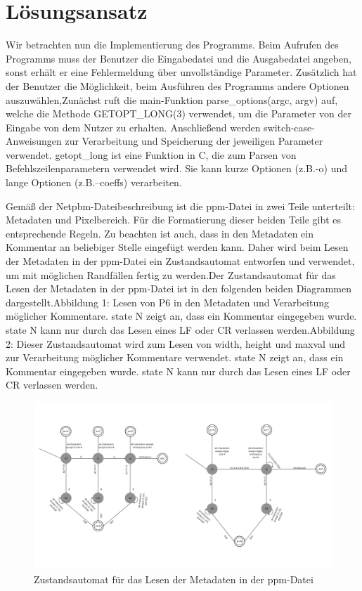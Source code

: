 \documentclass[course=erap]{aspdoc}
\begin{document}
\section{Lösungsansatz}

\par
Wir betrachten nun die Implementierung des Programms. Beim Aufrufen des Programms muss der Benutzer die Eingabedatei und die Ausgabedatei angeben, sonst erhält er eine Fehlermeldung über unvollständige Parameter. Zusätzlich hat der Benutzer die Möglichkeit, beim Ausführen des Programms andere Optionen auszuwählen,Zunächst ruft die main-Funktion parse\_options(argc, argv) auf, welche die Methode GETOPT\_LONG(3) verwendet, um die Parameter von der Eingabe von dem Nutzer zu erhalten. Anschließend werden switch-case-Anweisungen zur Verarbeitung und Speicherung der jeweiligen Parameter verwendet. getopt\_long ist eine Funktion in C, die zum Parsen von Befehlszeilenparametern verwendet wird. Sie kann kurze Optionen (z.B.-o) und lange Optionen (z.B.--coeffs) verarbeiten. 

\par
Gemäß der Netpbm-Dateibeschreibung ist die ppm-Datei in zwei Teile unterteilt: Metadaten und Pixelbereich. Für die Formatierung dieser beiden Teile gibt es entsprechende Regeln. Zu beachten ist auch, dass in den Metadaten ein Kommentar an beliebiger Stelle eingefügt werden kann. Daher wird beim Lesen der Metadaten in der ppm-Datei ein Zustandsautomat entworfen und verwendet, um mit möglichen Randfällen fertig zu werden.Der Zustandsautomat für das Lesen der Metadaten in der ppm-Datei ist in den folgenden beiden Diagrammen dargestellt.Abbildung 1: Lesen von P6 in den Metadaten und Verarbeitung möglicher Kommentare. state N zeigt an, dass ein Kommentar eingegeben wurde. state N kann nur durch das Lesen eines LF oder CR verlassen werden.Abbildung 2: Dieser Zustandsautomat wird zum Lesen von width, height und maxval und zur Verarbeitung möglicher Kommentare verwendet. state N zeigt an, dass ein Kommentar eingegeben wurde. state N kann nur durch das Lesen eines LF oder CR verlassen werden.

\begin{figure}[h]
\centering
\includegraphics[width=1\textwidth]{Bilder/auto.png}
\caption{Zustandsautomat für das Lesen der Metadaten in der ppm-Datei}
\end{figure}
\end{document}
